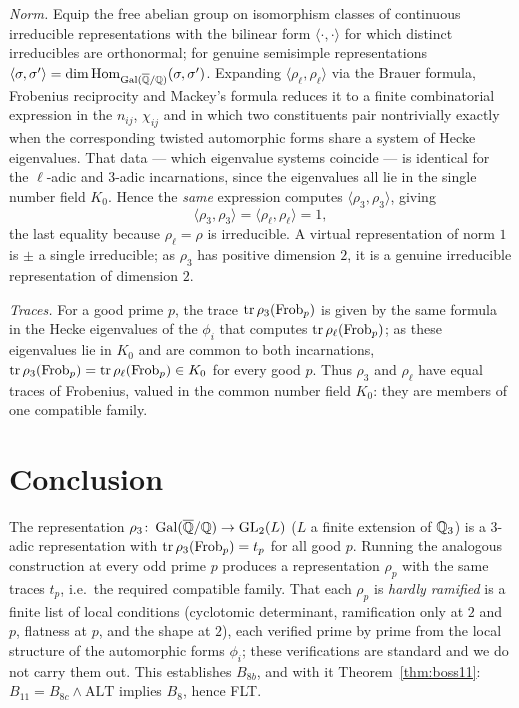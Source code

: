 \documentclass[11pt]{article}
\begin{document}
\emph{Norm.} Equip the free abelian group on isomorphism classes of continuous
irreducible representations with the bilinear form $\langle\cdot,\cdot\rangle$
for which distinct irreducibles are orthonormal; for genuine semisimple
representations $\langle\sigma,\sigma'\rangle=\dim\operatorname{Hom}_{\operatorname{Gal}(\overline{\mathbb{Q}}/\mathbb{Q})}(\sigma,\sigma')$.
Expanding $\langle\rho_\ell,\rho_\ell\rangle$ via the Brauer formula, Frobenius
reciprocity and Mackey's formula reduces it to a finite combinatorial expression
in the $n_{ij}$, $\chi_{ij}$ and in which two constituents pair nontrivially
exactly when the corresponding twisted automorphic forms share a system of Hecke
eigenvalues. That data --- which eigenvalue systems coincide --- is identical for
the $\ell$-adic and $3$-adic incarnations, since the eigenvalues all lie in the
single number field $K_0$. Hence the \emph{same} expression computes
$\langle\rho_3,\rho_3\rangle$, giving
\[
  \langle\rho_3,\rho_3\rangle=\langle\rho_\ell,\rho_\ell\rangle=1,
\]
the last equality because $\rho_\ell=\rho$ is irreducible. A virtual
representation of norm $1$ is $\pm$ a single irreducible; as $\rho_3$ has
positive dimension $2$, it is a genuine irreducible representation of dimension
$2$.

\emph{Traces.} For a good prime $p$, the trace $\operatorname{tr}\rho_3(\operatorname{Frob}_p)$ is given by
the same formula in the Hecke eigenvalues of the $\phi_i$ that computes
$\operatorname{tr}\rho_\ell(\operatorname{Frob}_p)$; as these eigenvalues lie in $K_0$ and are common to
both incarnations, $\operatorname{tr}\rho_3(\operatorname{Frob}_p)=\operatorname{tr}\rho_\ell(\operatorname{Frob}_p)\in K_0$ for every
good $p$. Thus $\rho_3$ and $\rho_\ell$ have equal traces of Frobenius, valued in
the common number field $K_0$: they are members of one compatible family.

\section{Conclusion}

The representation $\rho_3\colon\operatorname{Gal}(\overline{\mathbb{Q}}/\mathbb{Q})\to\operatorname{GL}_2(L)$ ($L$ a finite extension of
$\mathbb{Q}_3$) is a $3$-adic representation with $\operatorname{tr}\rho_3(\operatorname{Frob}_p)=t_p$ for all good
$p$. Running the analogous construction at every odd prime $p$ produces a
representation $\rho_p$ with the same traces $t_p$, i.e.\ the required
compatible family. That each $\rho_p$ is \emph{hardly ramified} is a finite list
of local conditions (cyclotomic determinant, ramification only at $2$ and $p$,
flatness at $p$, and the shape at $2$), each verified prime by prime from the
local structure of the automorphic forms $\phi_i$; these verifications are
standard and we do not carry them out. This establishes $B_{8b}$, and with it
Theorem~\ref{thm:boss11}: $B_{11}=B_{8c}\wedge\text{ALT}$ implies
$B_8$, hence FLT.
\end{document}
